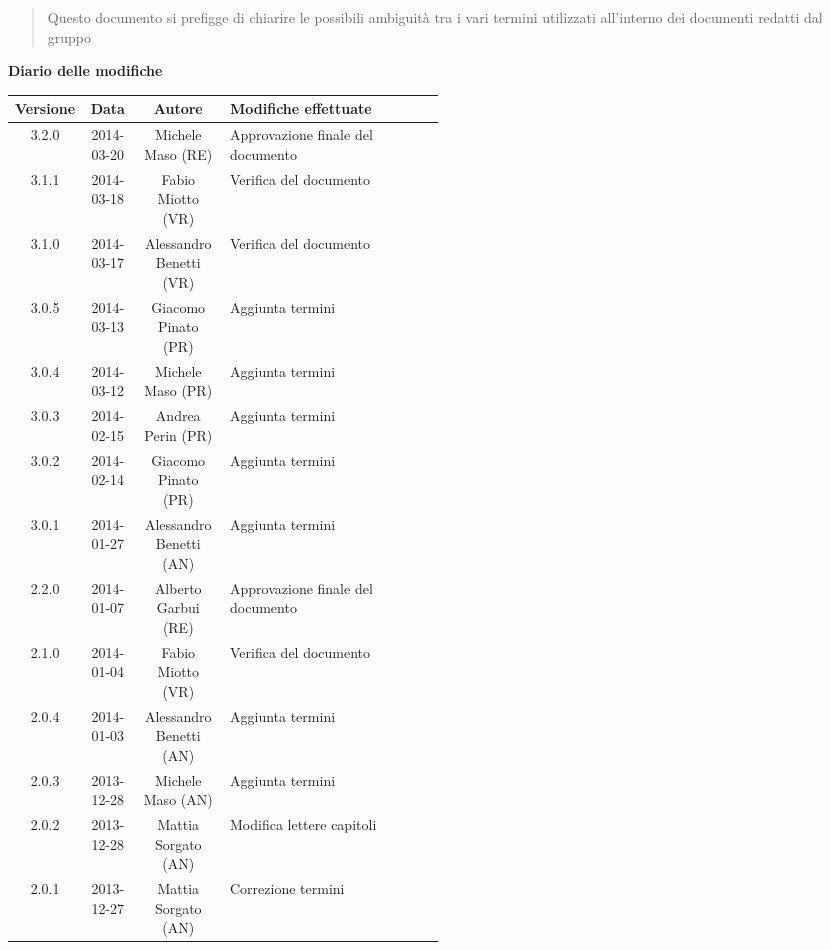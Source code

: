 \begin{abstract}
\begin{center}
Questo documento si prefigge di chiarire le possibili ambiguità tra i vari termini utilizzati all'interno dei documenti redatti dal gruppo \NomeGruppo{}
\end{center}
\end{abstract}

\newpage
\textbf{Diario delle modifiche}
\begin{center}
\begin{longtable}{|c|c|c|p{0.5\linewidth}|}
\toprule
\textbf{Versione} & \textbf{Data} & \textbf{Autore} & \textbf{Modifiche effettuate}\\

\midrule
3.2.0 & 2014-03-20 & Michele Maso (RE) & Approvazione finale del documento\\
\midrule
3.1.1 & 2014-03-18 & Fabio Miotto (VR) & Verifica del documento \\
\midrule
3.1.0 & 2014-03-17 & Alessandro Benetti (VR) & Verifica del documento \\
\midrule
3.0.5 & 2014-03-13 & Giacomo Pinato (PR) & Aggiunta termini\\
\midrule
3.0.4 & 2014-03-12 & Michele Maso (PR) & Aggiunta termini\\
\midrule
3.0.3 & 2014-02-15 & Andrea Perin (PR) & Aggiunta termini\\
\midrule
3.0.2 & 2014-02-14 & Giacomo Pinato (PR) & Aggiunta termini\\
\midrule
3.0.1 & 2014-01-27 & Alessandro Benetti (AN) & Aggiunta termini\\


\midrule
2.2.0 & 2014-01-07 & Alberto Garbui (RE) & Approvazione finale del documento\\
\midrule
2.1.0 & 2014-01-04 & Fabio Miotto (VR) & Verifica del documento \\
\midrule
2.0.4 & 2014-01-03 & Alessandro Benetti (AN) & Aggiunta termini\\
\midrule
2.0.3 & 2013-12-28 & Michele Maso (AN) & Aggiunta termini\\
\midrule
2.0.2 & 2013-12-28 & Mattia Sorgato (AN) & Modifica lettere capitoli\\
\midrule
2.0.1 & 2013-12-27 & Mattia Sorgato (AN) & Correzione termini\\


\end{longtable}
\end{center}
